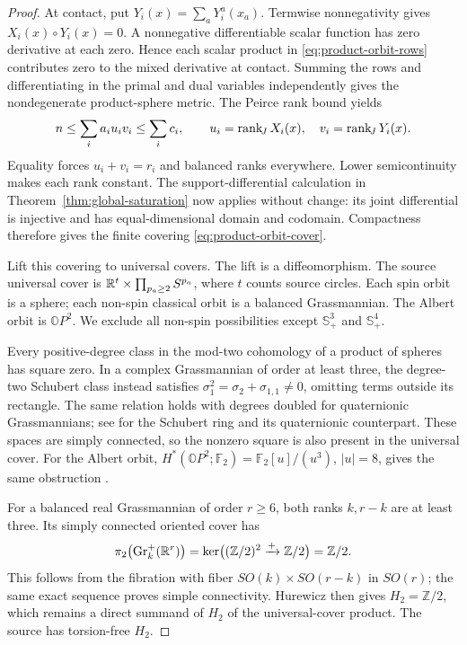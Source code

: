 \begin{proof}
At contact, put $Y_i(x)=\sum_aY_i^a(x_a)$. Termwise nonnegativity gives
$X_i(x)\circ Y_i(x)=0$. A nonnegative differentiable scalar function has
zero derivative at each zero. Hence each scalar product in
\eqref{eq:product-orbit-rows} contributes zero to the mixed derivative
at contact. Summing the rows and differentiating in the primal and dual variables
independently gives the nondegenerate product-sphere metric.
The Peirce rank bound yields
\[
 n\leq\sum_i a_i u_i v_i\leq\sum_i c_i,
 \qquad u_i=\operatorname{rank}_{\!J} X_i(x),\quad v_i=\operatorname{rank}_{\!J} Y_i(x).
\]
Equality forces $u_i+v_i=r_i$ and balanced ranks everywhere. Lower
semicontinuity makes each rank constant. The support-differential
calculation in Theorem~\ref{thm:global-saturation} now applies without
change: its joint differential is injective and has equal-dimensional
domain and codomain. Compactness therefore gives the finite covering
\eqref{eq:product-orbit-cover}.

Lift this covering to universal covers. The lift is a diffeomorphism.
The source universal cover is $\mathbb R^t\times\prod_{p_a\geq2}S^{p_a}$,
where $t$ counts source circles. Each spin orbit is a sphere; each
non-spin classical orbit is a balanced Grassmannian. The Albert orbit
is $\mathbb OP^2$. We exclude all non-spin possibilities except
$\mathbb S_+^3$ and $\mathbb S_+^4$.

Every positive-degree class in the mod-two cohomology of a product of
spheres has square zero. In a complex Grassmannian of order at least
three, the degree-two Schubert class instead satisfies
$\sigma_1^2=\sigma_2+\sigma_{1,1}\ne0$, omitting terms outside its
rectangle. The same relation holds with degrees doubled for quaternionic
Grassmannians; see \cite[Section~2]{SankaranSarkar2009} for the Schubert
ring and its quaternionic counterpart. These spaces are simply
connected, so the nonzero square is also present in the universal cover.
For the Albert orbit, $H^*(\mathbb OP^2;\mathbb F_2)
=\mathbb F_2[u]/(u^3)$, $|u|=8$, gives the same obstruction
\cite[Example~4.47]{Hatcher2002}.

For a balanced real Grassmannian of order $r\geq6$, both ranks $k,r-k$
are at least three. Its simply connected oriented cover has
\[
 \pi_2\bigl(\operatorname{Gr}_k^+(\mathbb R^r)\bigr)
 =\ker\bigl((\mathbb Z/2)^2\xrightarrow{+}\mathbb Z/2\bigr)
 =\mathbb Z/2.
\]
This follows from the fibration with fiber $SO(k)\times SO(r-k)$ in
$SO(r)$; the same exact sequence proves simple connectivity. Hurewicz
then gives $H_2=\mathbb Z/2$, which remains a direct summand of $H_2$ of
the universal-cover product. The source has torsion-free $H_2$.


\end{proof}
